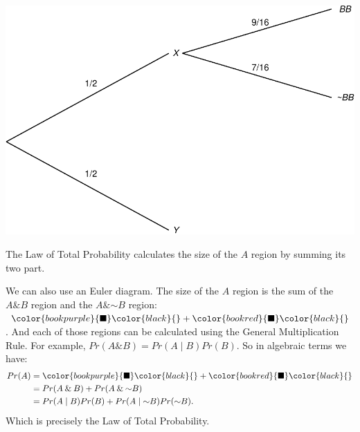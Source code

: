 \documentclass[justified]{tufte-book}
\newcommand{\given}{\mid}
\renewcommand{\neg}{\mathbin{\sim}}
\renewcommand{\wedge}{\mathbin{\&}}
\newcommand{\p}{Pr}
\theoremstyle{definition}
\theoremstyle{definition}
\theoremstyle{definition}
\theoremstyle{remark}
\begin{document}
\begin{marginfigure}
\includegraphics{_main_files/figure-latex/unnamed-chunk-72-1} \caption[The Law of Total Probability calculates the size of the $A$ region by summing its two part]{The Law of Total Probability calculates the size of the $A$ region by summing its two part.}\label{fig:unnamed-chunk-72}
\end{marginfigure}

We can also use an Euler diagram. The size of the \(A\) region is the sum of the \(A \wedge B\) region and the \(A \wedge \neg B\) region: \(\color{bookpurple}{\blacksquare}\color{black}{} + \color{bookred}{\blacksquare}\color{black}{}\). And each of those regions can be calculated using the General Multiplication Rule. For example, \(\p(A \wedge B) = \p(A \given B) \p(B)\). So in algebraic terms we have:
\[
  \begin{aligned}
    \p(A) &= \color{bookpurple}{\blacksquare}\color{black}{} 
             + \color{bookred}{\blacksquare}\color{black}{}\\
          &= \p(A \wedge B) + \p(A \wedge \neg B)\\
          &= \p(A \given B) \p(B) + \p(A \given \neg B) \p(\neg B).
  \end{aligned}
\]
Which is precisely the Law of Total Probability.
\end{document}
